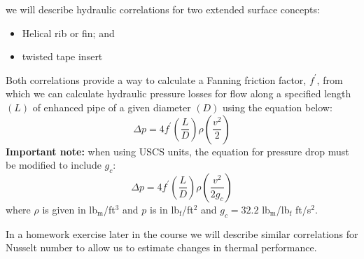  we will describe hydraulic correlations for two extended surface concepts:  

\begin{itemize}
\item Helical rib or fin; and
\item twisted tape insert
\end{itemize} 
Both correlations provide a way to calculate a Fanning friction factor, $f^{\prime}$, from which we can calculate hydraulic pressure losses for flow along a specified length $(L)$ of enhanced pipe of a given diameter $(D)$ using the equation below:
$$\Delta p = 4 f^{\prime} \left(\frac{L}{D} \right)\rho \left(\frac{v^2}{2} \right)$$
\textbf{Important note:} when using USCS units, the equation for pressure drop must be modified to include $g_c$:
$$\Delta p = 4 f^{\prime} \left(\frac{L}{D} \right)\rho \left(\frac{v^2}{2g_c} \right)$$
where $\rho$ is given in lb$_{\text{m}}$/ft$^{3}$ and $p$ is in lb$_{\text{f}}$/ft$^{2}$ and $g_c = 32.2$ lb$_{\text{m}}$/lb$_{\text{f}}$ ft/s$^{2}$. 

In a homework exercise later in the course we will describe similar correlations for Nusselt number to allow us to estimate changes in thermal performance.

